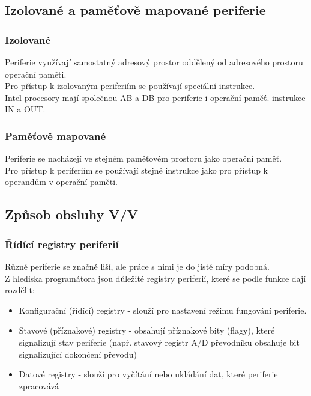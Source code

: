 \subsection{Izolované a paměťově mapované periferie}
\subsubsection{Izolované}
Periferie využívají samostatný adresový prostor oddělený od adresového prostoru operační paměti.\\
Pro přístup k izolovaným periferiím se používají speciální instrukce.\\
Intel procesory mají společnou AB a DB pro periferie i operační paměť. instrukce IN a OUT.

\subsubsection*{Paměťově mapované}
Periferie se nacházejí ve stejném paměťovém prostoru jako operační paměť. \\
Pro přístup k periferiím se používají stejné instrukce jako pro přístup k operandům v operační paměti.\\
\subsection{Způsob obsluhy V/V}
\subsubsection*{Řídící registry periferií}
Různé periferie se značně liší, ale práce s nimi je do jisté míry podobná.\\
Z hlediska programátora jsou důležité registry periferií, které se podle funkce dají rozdělit:
\begin{itemize}
    \item Konfigurační (řídící) registry - slouží pro nastavení režimu fungování periferie.
    \item Stavové (příznakové) registry - obsahují příznakové bity (flagy), které signalizují stav periferie (např. stavový registr A/D převodníku obsahuje bit signalizující dokončení převodu)
    \item Datové registry - slouží pro vyčítání nebo ukládání dat, které periferie zpracovává
\end{itemize}

